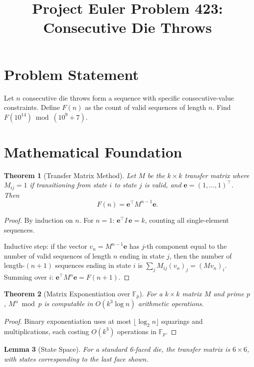 \documentclass[12pt]{article}
\title{Project Euler Problem 423: Consecutive Die Throws}
\author{}
\date{}
\newtheorem{theorem}{Theorem}
\newtheorem{lemma}[theorem]{Lemma}
\begin{document}
\maketitle

\section{Problem Statement}
Let $n$ consecutive die throws form a sequence with specific consecutive-value constraints. Define $F(n)$ as the count of valid sequences of length $n$. Find $F(10^{14}) \bmod (10^9+7)$.

\section{Mathematical Foundation}

\begin{theorem}[Transfer Matrix Method]
Let $M$ be the $k \times k$ transfer matrix where $M_{ij} = 1$ if transitioning from state $i$ to state $j$ is valid, and $\mathbf{e} = (1,\ldots,1)^\top$. Then
\[
F(n) = \mathbf{e}^\top M^{n-1} \mathbf{e}.
\]
\end{theorem}

\begin{proof}
By induction on $n$. For $n=1$: $\mathbf{e}^\top I\, \mathbf{e} = k$, counting all single-element sequences.

Inductive step: if the vector $v_n = M^{n-1}\mathbf{e}$ has $j$-th component equal to the number of valid sequences of length $n$ ending in state $j$, then the number of length-$(n\!+\!1)$ sequences ending in state $i$ is $\sum_j M_{ij}(v_n)_j = (Mv_n)_i$. Summing over $i$: $\mathbf{e}^\top M^n \mathbf{e} = F(n+1)$.
\end{proof}

\begin{theorem}[Matrix Exponentiation over $\mathbb{F}_p$]
For a $k \times k$ matrix $M$ and prime $p$, $M^n \bmod p$ is computable in $O(k^3 \log n)$ arithmetic operations.
\end{theorem}

\begin{proof}
Binary exponentiation uses at most $\lfloor \log_2 n \rfloor$ squarings and multiplications, each costing $O(k^3)$ operations in $\mathbb{F}_p$.
\end{proof}

\begin{lemma}[State Space]
For a standard 6-faced die, the transfer matrix is $6 \times 6$, with states corresponding to the last face shown.
\end{lemma}
\end{document}
